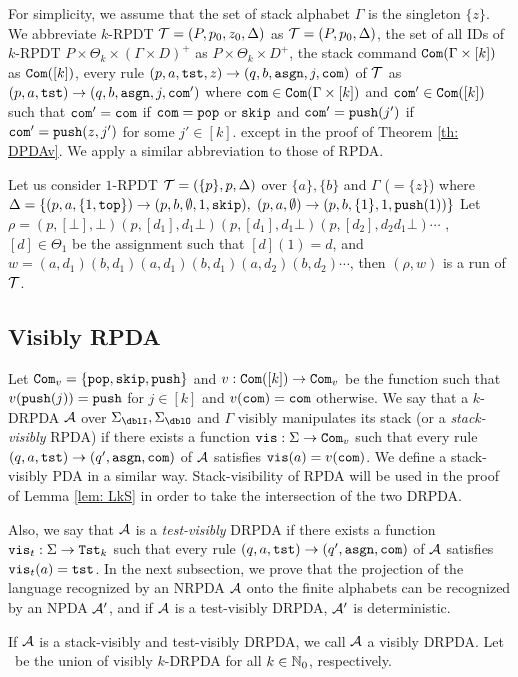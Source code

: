 \medskip
For simplicity,
we assume that the set of stack alphabet $\Gamma$
is the singleton $\{z\}$.
We abbreviate
$k$-RPDT ${\cal T}=(P, p_0, z_0, \Delta)$ as ${\cal T}=(P, p_0, \Delta)$,
the set of all
IDs of $k$-RPDT $P\times\Theta_k\times(\Gamma\times D)^+$
as $P\times\Theta_k\times D^+$,
the stack command $\mathtt{Com}(\Gamma\times[k])$ as $\mathtt{Com}([k])$,
every rule $(p, a, \mathtt{tst}, z) \to (q, b, \mathtt{asgn}, j, \mathtt{com})$ of ${\cal T}$ as
$(p, a, \mathtt{tst}) \to (q, b, \mathtt{asgn}, j, \mathtt{com}')$ where
$\mathtt{com}\in\mathtt{Com}(\Gamma\times[k])$ and $\mathtt{com}'\in\mathtt{Com}([k])$
such that $\mathtt{com}'=\mathtt{com}$ if $\mathtt{com}=\mathtt{pop}$ or $\mathtt{skip}$ and
$\mathtt{com}'=\mathtt{push}(j')$ if $\mathtt{com}'=\mathtt{push}(z,j')$ for some $j'\in[k]$.
except in the proof of Theorem \ref{th: DPDAv}.
We apply a similar abbreviation to those of RPDA.

\begin{example}
\label{ex: RPDT}
Let us consider $1$-RPDT
${\cal T} = (\{p\},p,\Delta)$
over $\{a\},\{b\}$
and $\Gamma$ ($=\{z\}$) where
$\Delta = \{
(p, a, \{1,\mathtt{top}\}) \rightarrow (p, b, \emptyset, 1, \mathtt{skip}),$
$(p, a, \emptyset) \rightarrow (p, b, \{1\}, 1, \mathtt{push}(1))
\}$
Let $\rho=(p,[\bot],\bot)(p,[d_1],d_1\bot)(p,[d_1],d_1\bot)(p,[d_2],d_2d_1\bot)\cdots$
, $[d]\in\Theta_1$ be the assignment such that $[d](1)=d$,
and
$w=(a,d_1)(b,d_1)(a,d_1)(b,d_1)(a,d_2)(b,d_2)\cdots$,
then $(\rho,w)$ is a run of ${\cal T}$.
\end{example}

\subsection{Visibly RPDA}
Let $\mathtt{Com}_v=\{\mathtt{pop},\mathtt{skip},\mathtt{push}\}$ and $v:\mathtt{Com}([k])\to\mathtt{Com}_v$ be the function such that $v(\mathtt{push}(j))=\mathtt{push}$ for $j\in[k]$ and $v(\mathtt{com})=\mathtt{com}$ otherwise.
We say that a $k$-DRPDA ${\cal A}$
over $\Sigma_\dblI,\Sigma_\dblO$ and $\Gamma$
visibly manipulates its stack (or a {\em stack-visibly} RPDA) if
there exists a function $\mathtt{vis}: \Sigma\to\mathtt{Com}_v$
such that
every rule $(q,a,\mathtt{tst})\to(q',\mathtt{asgn},\mathtt{com})$ of ${\cal A}$
satisfies $\mathtt{vis}(a)=v(\mathtt{com})$.
We define a stack-visibly PDA in a similar way.
Stack-visibility of RPDA will be used
in the proof of Lemma \ref{lem: LkS}
in order to take the intersection of the two DRPDA.

Also, we say that ${\cal A}$ is a {\em test-visibly} DRPDA if
there exists a function $\mathtt{vis}_t: \Sigma\to\mathtt{Tst}_k$
such that
every rule $(q,a,\mathtt{tst})\to(q',\mathtt{asgn},\mathtt{com})$ of ${\cal A}$
satisfies $\mathtt{vis}_t(a)=\mathtt{tst}$.
In the next subsection,
we prove that the projection of the language recognized by
an NRPDA ${\cal A}$ onto the finite alphabets
can be recognized by an NPDA ${\cal A}'$,
and if ${\cal A}$ is a test-visibly DRPDA,
${\cal A}'$ is deterministic.

If ${\cal A}$ is a stack-visibly and test-visibly DRPDA,
we call ${\cal A}$ a visibly DRPDA.
Let \DRPDAv\ be the union of visibly $k$-DRPDA for all $k\in\mathbb{N}_0$, respectively.

